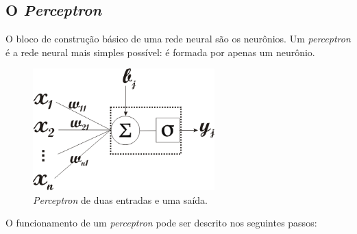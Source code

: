 %

\subsection{O \textit{Perceptron}}

O bloco de construção básico de uma rede neural são os neurônios. Um \textit{perceptron} é a rede
neural mais simples possível: é formada por apenas um neurônio.

\begin{figure}[ht]
\centering
\includegraphics[width=7cm]{figuras/rede_neural_neuronio}
\caption{\textit{Perceptron} de duas entradas e uma saída.}\label{fig:rede_neural_perceptron}
\end{figure}


O funcionamento de um \textit{perceptron} pode ser descrito nos seguintes passos:

